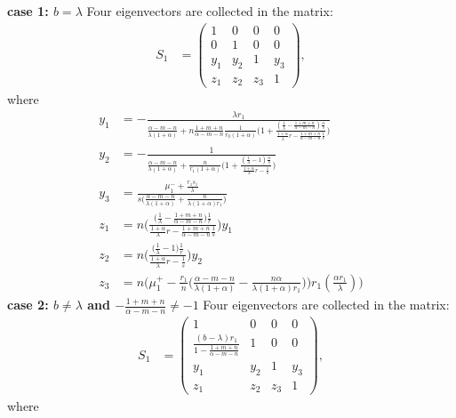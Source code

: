 \documentclass[a4paper,11pt]{article}
\begin{document}
{\bf case 1: $b=\lambda$}
Four eigenvectors are collected in the matrix:
\begin{align*}
 S_1&=
 \begin{pmatrix}
    1 & 0 & 0 & 0\\
    0 & 1 & 0 & 0\\
    y_1 & y_2 & 1 & y_3\\
    z_1 & z_2 & z_3 &1
 \end{pmatrix},
\end{align*}
where
\begin{align*}
 y_1&=-\frac{\lambda r_1}{\frac{\alpha-m-n}{\lambda(1+\alpha)} + n\frac{1+m+n}{\alpha-m-n}\frac{1}{r_0(1+\alpha)}\Big(1 + \frac{(\frac{1}{\lambda}-\frac{1+m+n}{\alpha-m-n})\frac{\alpha}{s}}{ \frac{1+\alpha}{\lambda}r -\frac{1+m+n}{\alpha-m-n} \frac{1}{s} }\Big) }\\
 y_2&=-\frac{1}{\frac{\alpha-m-n}{\lambda(1+\alpha)} + \frac{n}{r_1(1+\alpha)}\Big(1 + \frac{(\frac{1}{\lambda}-1)\frac{\alpha}{s}}{ \frac{1+\alpha}{\lambda}r - \frac{1}{s} }\Big) }\\
 y_3&=\frac{\mu_1^- +\frac{r_1s_1}{\lambda}}{s\Big(\frac{\alpha-m-n}{\lambda(1+\alpha)} + \frac{n}{\lambda(1+\alpha)r_1}\Big)}\\
 z_1&=n\bigg(\frac{\big(\frac{1}{\lambda}-\frac{1+m+n}{\alpha-m-n}\big)\frac{1}{r}}{ \frac{1+\alpha}{\lambda}r -\frac{1+m+n}{\alpha-m-n} \frac{1}{s} }\bigg)y_1 \\
 z_2&=n\bigg(\frac{\big(\frac{1}{\lambda}-1\big)\frac{1}{r}}{ \frac{1+\alpha}{\lambda}r - \frac{1}{s} }\bigg)y_2 \\
 z_3&=n\bigg(\mu_1^+-\frac{r_1}{n}\Big(\frac{\alpha-m-n}{\lambda(1+\alpha)} - \frac{n\alpha}{\lambda(1+\alpha)r_1}\Big)\bigg)r_1(\frac{\alpha r_1}{\lambda})\bigg)
\end{align*}
{\bf case 2: $b\ne\lambda$ and $-\frac{1+m+n}{\alpha-m-n}\ne -1$}
Four eigenvectors are collected in the matrix:
\begin{align*}
 S_1&=
 \begin{pmatrix}
    1 & 0 & 0 & 0\\
    \frac{(b-\lambda)r_1}{1-\frac{1+m+n}{\alpha-m-n}} & 1 & 0 & 0\\
    y_1 & y_2 & 1 & y_3\\
    z_1 & z_2 & z_3 &1
 \end{pmatrix},
\end{align*}
where
\end{document}
